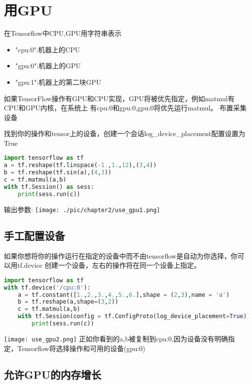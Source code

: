 \section{用GPU}
在Tensorflow中CPU,GPU用字符串表示
\begin{itemize}
\item "cpu:0":机器上的CPU
\item "gpu:0":机器上的GPU
\item "gpu:1":机器上的第二块GPU
\end{itemize}
 如果TensorFlow操作有GPU和CPU实现，GPU将被优先指定，例如matmul有CPU和GPU内核，在系统上 有cpu:0和gpu:0,gpu:0将优先运行matmul。
布置采集设备

找到你的操作和tensor上的设备，创建一个会话log\_device\_placement配置设置为True
\begin{lstlisting}[language=Python]
import tensorflow as tf
a = tf.reshape(tf.linspace(-1.,1.,12),(3,4))
b = tf.reshape(tf.sin(a),(4,3))
c = tf.matmul(a,b)
with tf.Session() as sess:
    print(sess.run(c))
\end{lstlisting}
输出参数:\newline
\texttt{[image: ./pic/chapter2/use\_gpu1.png]}\newline
\subsection{手工配置设备}
如果你想将你的操作运行在指定的设备中而不由tensorflow是自动为你选择，你可以用tf.device 创建一个设备，左右的操作将在同一个设备上指定。
\begin{lstlisting}[language=Python]
import tensorflow as tf
with tf.device('/cpu:0'):
    a = tf.constant([1.,2.,3.,4.,5.,6.],shape = (2,3),name = 'a')
    b = tf.reshape(a,shape=(3,2))
    c = tf.matmul(a,b)
    with tf.Session(config = tf.ConfigProto(log_device_placement=True)) as sess:
        print(sess.run(c))
\end{lstlisting}
\texttt{[image: use\_gpu2.png]}\newline
正如你看到的a,b被复制到cpu:0,因为设备没有明确指定，Tensorflow将选择操作和可用的设备(gpu:0)

\subsection{允许GPU的内存增长}

